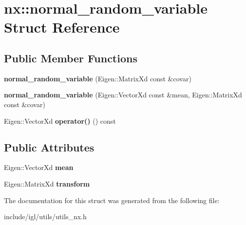 \hypertarget{structnx_1_1normal__random__variable}{}\section{nx\+:\+:normal\+\_\+random\+\_\+variable Struct Reference}
\label{structnx_1_1normal__random__variable}
\subsection*{Public Member Functions}
\begin{DoxyCompactItemize}
\item 
\mbox{\label{structnx_1_1normal__random__variable_aaa7d0192050586d18b7c4341b3fc769c}} 
{\bfseries normal\+\_\+random\+\_\+variable} (Eigen\+::\+Matrix\+Xd const \&covar)
\item 
\mbox{\label{structnx_1_1normal__random__variable_a187f9f6f89dc775febc1baceddaa8e85}} 
{\bfseries normal\+\_\+random\+\_\+variable} (Eigen\+::\+Vector\+Xd const \&mean, Eigen\+::\+Matrix\+Xd const \&covar)
\item 
\mbox{\label{structnx_1_1normal__random__variable_ad04ed60cc59a9e80f5c8ea4a578cc9a8}} 
Eigen\+::\+Vector\+Xd {\bfseries operator()} () const
\end{DoxyCompactItemize}
\subsection*{Public Attributes}
\begin{DoxyCompactItemize}
\item 
\mbox{\label{structnx_1_1normal__random__variable_ac37cbacaa347e1eeab2c736a7b120f06}} 
Eigen\+::\+Vector\+Xd {\bfseries mean}
\item 
\mbox{\label{structnx_1_1normal__random__variable_a6bd3927c55a978da2e4132ea135bb269}} 
Eigen\+::\+Matrix\+Xd {\bfseries transform}
\end{DoxyCompactItemize}


The documentation for this struct was generated from the following file\+:\begin{DoxyCompactItemize}
\item 
include/igl/utils/utils\+\_\+nx.\+h\end{DoxyCompactItemize}

